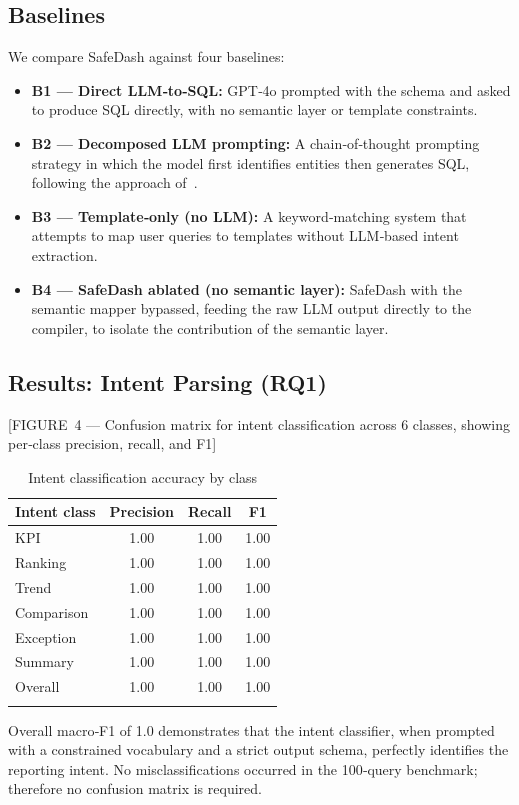 \documentclass[11pt]{article}
\begin{document}
\subsection{Baselines}
We compare SafeDash against four baselines:
\begin{itemize}
  \item \textbf{B1 — Direct LLM‑to‑SQL:} GPT‑4o prompted with the schema and asked to produce SQL directly, with no semantic layer or template constraints.
  \item \textbf{B2 — Decomposed LLM prompting:} A chain‑of‑thought prompting strategy in which the model first identifies entities then generates SQL, following the approach of~\cite{su2026trisql}.
  \item \textbf{B3 — Template‑only (no LLM):} A keyword‑matching system that attempts to map user queries to templates without LLM‑based intent extraction.
  \item \textbf{B4 — SafeDash ablated (no semantic layer):} SafeDash with the semantic mapper bypassed, feeding the raw LLM output directly to the compiler, to isolate the contribution of the semantic layer.
\end{itemize}

\subsection{Results: Intent Parsing (RQ1)}
[FIGURE 4 — Confusion matrix for intent classification across 6 classes, showing per‑class precision, recall, and F1]

\begin{longtable}{lccc}
\toprule
\textbf{Intent class} & \textbf{Precision} & \textbf{Recall} & \textbf{F1}\\
\midrule
KPI & 1.00 & 1.00 & 1.00\\
Ranking & 1.00 & 1.00 & 1.00\\
Trend & 1.00 & 1.00 & 1.00\\
Comparison & 1.00 & 1.00 & 1.00\\
Exception & 1.00 & 1.00 & 1.00\\
Summary & 1.00 & 1.00 & 1.00\\
\midrule
Overall & 1.00 & 1.00 & 1.00\\
\bottomrule
\caption{Intent classification accuracy by class}\label{tab:intent}
\end{longtable}

Overall macro‑F1 of 1.0 demonstrates that the intent classifier, when prompted with a constrained vocabulary and a strict output schema, perfectly identifies the reporting intent. No misclassifications occurred in the 100‑query benchmark; therefore no confusion matrix is required.
\end{document}
